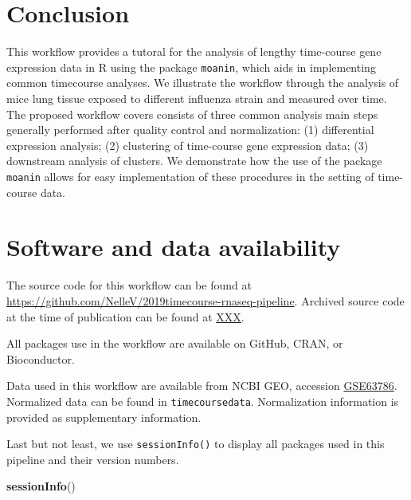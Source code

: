 \documentclass[9pt,a4paper,]{extarticle}
\newenvironment{Shaded}{\begin{snugshade}}{\end{snugshade}}
\newcommand{\KeywordTok}[1]{\textcolor[rgb]{0.13,0.29,0.53}{\textbf{#1}}}
\newcommand{\NormalTok}[1]{#1}
\begin{document}
\hypertarget{conclusion}{%
\section{Conclusion}\label{conclusion}}

This workflow provides a tutoral for the analysis of lengthy time-course gene
expression data in R using the package \texttt{moanin}, which aids in implementing
common timecourse analyses. We illustrate the workflow through the analysis of
mice lung tissue exposed to different influenza strain and measured over time.
The proposed workflow covers consists of three common analysis main steps
generally performed after quality control and normalization: (1) differential
expression analysis; (2) clustering of time-course gene expression data; (3)
downstream analysis of clusters. We demonstrate how the use of the package
\texttt{moanin} allows for easy implementation of these procedures in the setting of
time-course data.

\hypertarget{software-and-data-availability}{%
\section{Software and data availability}\label{software-and-data-availability}}

The source code for this workflow can be found at
\url{https://github.com/NelleV/2019timecourse-rnaseq-pipeline}.
Archived source code at the time of publication can be found at \url{XXX}.

All packages use in the workflow are available on GitHub, CRAN, or
Bioconductor.

Data used in this workflow are available from NCBI GEO, accession
\href{https://www.ncbi.nlm.nih.gov/geo/query/acc.cgi?acc=GSE63786}{GSE63786}.
Normalized data can be found in \texttt{timecoursedata}. Normalization information is
provided as supplementary information.

Last but not least, we use \texttt{sessionInfo()} to display all packages used in
this pipeline and their version numbers.

\begin{Shaded}
\begin{Highlighting}[]
\KeywordTok{sessionInfo}\NormalTok{()}
\end{Highlighting}
\end{Shaded}
\end{document}
